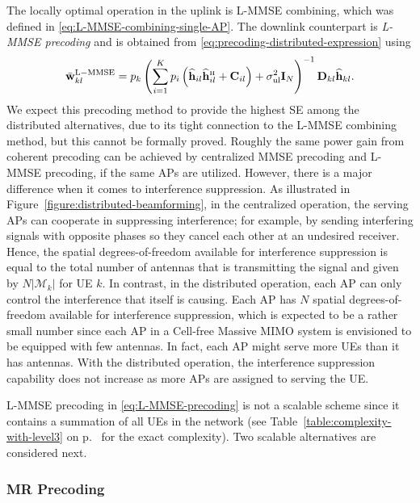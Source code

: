 The locally optimal operation in the uplink is L-MMSE combining, which was defined in \eqref{eq:L-MMSE-combining-single-AP}. The downlink counterpart is \emph{L-MMSE precoding} and is obtained from \eqref{eq:precoding-distributed-expression} using
\begin{equation} \label{eq:L-MMSE-precoding}
\bar{\vect{w}}_{kl}^{{\rm L-MMSE}} =  p_{k}  \left( \sum\limits_{i=1}^{K} p_{i} \left( \widehat{\vect{h}}_{il} \widehat{\vect{h}}_{il}^{\Htran} + \vect{C}_{il} \right) + \sigmaUL  \vect{I}_{N} \right)^{-1}   \vect{D}_{kl}  \widehat{\vect{h}}_{kl}.
\end{equation}
We expect this precoding method to provide the highest SE among the distributed alternatives, due to its tight connection to the L-MMSE combining method, but this cannot be formally proved. 
Roughly the same power gain from coherent precoding can be achieved by centralized MMSE precoding and L-MMSE precoding, if the same APs are utilized. However, there is a major difference when it comes to interference suppression.
As illustrated in Figure~\ref{figure:distributed-beamforming}, in the centralized operation, the serving APs can cooperate in suppressing interference; for example, by sending interfering signals with opposite phases so they cancel each other at an undesired receiver. Hence, the spatial degrees-of-freedom available for interference suppression is equal to the total number of antennas that is transmitting the signal and given by $N |\mathcal{M}_k|$ for UE $k$.
In contrast, in the distributed operation, each AP can only control the interference that itself is causing. Each AP has $N$  spatial degrees-of-freedom available for interference suppression, which is expected to be a rather small number since each AP in a Cell-free Massive MIMO system is envisioned to be equipped with few antennas. In fact, each AP might serve more UEs than it has antennas. With the distributed operation, the interference suppression capability does not increase as more APs are assigned to serving the UE.


L-MMSE precoding in \eqref{eq:L-MMSE-precoding} is not a scalable scheme since it contains a summation of all UEs in the network (see Table~\ref{table:complexity-with-level3} on p.~\pageref{table:complexity-with-level3} for the exact complexity). 
Two scalable alternatives are considered next.

\subsubsection{MR Precoding}

